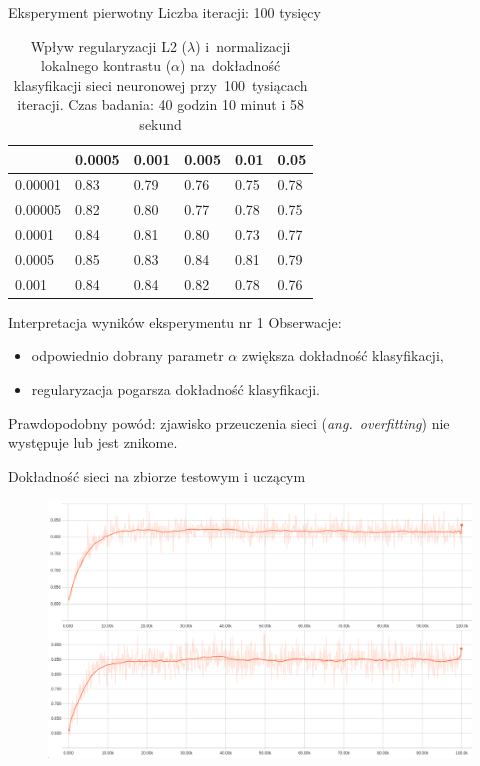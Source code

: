 \documentclass[xcolor=dvipsnames]{beamer}
\begin{document}
\begin{frame}{Eksperyment pierwotny}
Liczba iteracji: 100 tysięcy
\begin{table}[H]
    \centering
    \begin{tabular}{|l|l|l|l|l|l|}
      \hline
      \backslashbox{$\alpha$}{$\lambda$} & 0.0005 & 0.001 & 0.005 & 0.01 & 0.05 \\
      \hline
      0.00001 & 0.83 & 0.79 & 0.76 & 0.75 & 0.78 \\
      \hline
      0.00005 & 0.82 & 0.80 & 0.77 & 0.78 & 0.75 \\
      \hline
      0.0001  & 0.84 & 0.81 & 0.80 & 0.73 & 0.77 \\
      \hline
      0.0005  & 0.85 & 0.83 & 0.84 & 0.81 & 0.79 \\
      \hline
      0.001   & 0.84 & 0.84 & 0.82 & 0.78 & 0.76 \\
      \hline
    \end{tabular}
    \caption{Wpływ regularyzacji L2 ($\lambda$) i~normalizacji lokalnego kontrastu ($\alpha$) na~dokładność klasyfikacji
    sieci neuronowej przy~100~tysiącach iteracji. Czas badania: 40 godzin 10 minut i 58 sekund}
    \label{table:wyniki1}
\end{table}
\end{frame}
\begin{frame}{Interpretacja wyników eksperymentu nr 1}
    Obserwacje:
    \begin{itemize}
        \item odpowiednio dobrany parametr $\alpha$ zwiększa dokładność klasyfikacji,
        \item regularyzacja pogarsza dokładność klasyfikacji.
    \end{itemize}
    \vspace{5mm}
    Prawdopodobny powód: zjawisko przeuczenia sieci (\textit{ang.~overfitting}) nie występuje lub jest znikome.
\end{frame}
\begin{frame}{Dokładność sieci na zbiorze testowym i uczącym}
  \begin{figure}
    \includegraphics[width=\textwidth]{img/badanie_1.png}
  \end{figure}
\end{frame}
\end{document}
